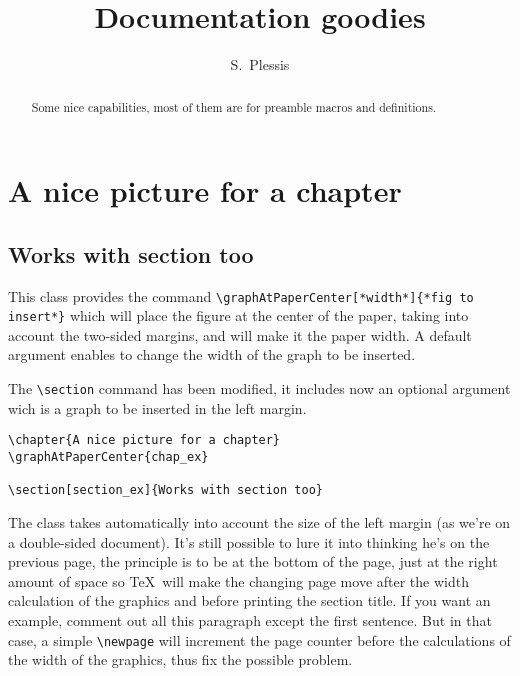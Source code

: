 \documentclass{documentation}
\makeatletter
\def\maketitle{%
\begin{titlepage}
\centering
{\Huge\@title}\vskip0.5ex
{\Large\@author}\vskip0.5ex
{version~\theversion}\vskip1ex
\texttt{[image: title\_graph]}
\setcounter{page}{-1}
\end{titlepage}
}
\makeatother
\begin{document}
\title{Documentation goodies}
\author{S.~Plessis}
\maketitle

\begin{abstract}
Some nice capabilities, most of them are for
preamble macros and definitions.
\end{abstract}

\tableofcontents

\chapter{A nice picture for a chapter}

\section[section_ex]{Works with section too}

This class provides the command \verb!\graphAtPaperCenter[*width*]{*fig to insert*}! which
will place the figure at the center of the paper, taking into
account the two-sided margins, and will make it the paper width. A default
argument enables to change the width of the graph to be inserted.

The \verb!\section! command has been modified, it includes now an optional
argument wich is a graph to be inserted in the left margin.

\begin{verbatim}
\chapter{A nice picture for a chapter}
\graphAtPaperCenter{chap_ex}

\section[section_ex]{Works with section too}
\end{verbatim}

The class takes automatically into account the size
of the left margin (as we're on a double-sided document). It's still
possible to lure it into thinking he's on the previous page, the
principle is to be at the bottom of the page, just at the right
amount of space so \TeX\ will make the changing page move after
the width calculation of the graphics and before printing
the section title. If you want an example, comment out all this
paragraph except the first sentence.
But in that case, a simple \verb!\newpage! will increment the page
counter before the calculations of the width of the graphics,
thus fix the possible problem.
\end{document}
